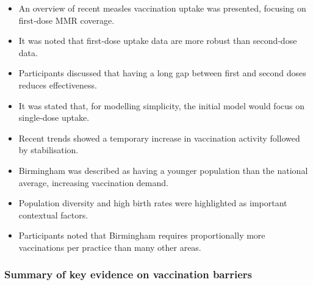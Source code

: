 \documentclass{article}
\begin{document}
\begin{itemize}
    \item An overview of recent measles vaccination uptake was presented, focusing on first‑dose MMR coverage.
    \item It was noted that first‑dose uptake data are more robust than second‑dose data.
    \item Participants discussed that having a long gap between first and second doses reduces effectiveness.
    \item It was stated that, for modelling simplicity, the initial model would focus on single‑dose uptake.
    \item Recent trends showed a temporary increase in vaccination activity followed by stabilisation.
    \item Birmingham was described as having a younger population than the national average, increasing vaccination demand.
    \item Population diversity and high birth rates were highlighted as important contextual factors.
    \item Participants noted that Birmingham requires proportionally more vaccinations per practice than many other areas.
\end{itemize}

\subsubsection{Summary of key evidence on vaccination barriers}
\end{document}
